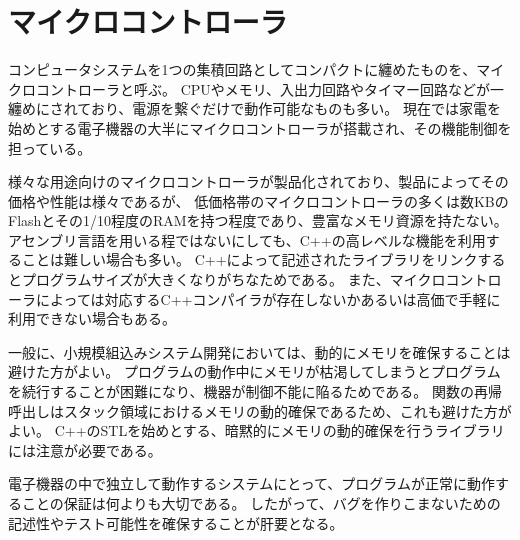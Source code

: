 \section{マイクロコントローラ}
コンピュータシステムを1つの集積回路としてコンパクトに纏めたものを、マイクロコントローラと呼ぶ。
CPUやメモリ、入出力回路やタイマー回路などが一纏めにされており、電源を繋ぐだけで動作可能なものも多い。
現在では家電を始めとする電子機器の大半にマイクロコントローラが搭載され、その機能制御を担っている。

様々な用途向けのマイクロコントローラが製品化されており、製品によってその価格や性能は様々であるが、
低価格帯のマイクロコントローラの多くは数KBのFlashとその1/10程度のRAMを持つ程度であり、豊富なメモリ資源を持たない。
アセンブリ言語を用いる程ではないにしても、C++の高レベルな機能を利用することは難しい場合も多い。
C++によって記述されたライブラリをリンクするとプログラムサイズが大きくなりがちなためである。
また、マイクロコントローラによっては対応するC++コンパイラが存在しないかあるいは高価で手軽に利用できない場合もある。

一般に、小規模組込みシステム開発においては、動的にメモリを確保することは避けた方がよい。
プログラムの動作中にメモリが枯渇してしまうとプログラムを続行することが困難になり、機器が制御不能に陥るためである。
関数の再帰呼出しはスタック領域におけるメモリの動的確保であるため、これも避けた方がよい。
C++のSTLを始めとする、暗黙的にメモリの動的確保を行うライブラリには注意が必要である。

電子機器の中で独立して動作するシステムにとって、プログラムが正常に動作することの保証は何よりも大切である。
したがって、バグを作りこまないための記述性やテスト可能性を確保することが肝要となる。
